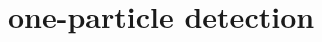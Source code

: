 \documentclass[prd,twocolumn,superscriptaddress,nofootinbib,floatfix,amsmath,amssymb]{revtex4-2}
\newcommand{\bx}{\bm{x}}
\newcommand{\sx}{\mathsf{x}}
\newcommand{\normal}[1]{:\mathrel{#1}:}
\DeclareMathOperator{\tr}{\text{tr}}
\newcommand{\rr}[1]{\left(#1\right)}
\newcommand{\eri}[1]{\textcolor{OliveGreen}{\textbf{[\textbf{\textcolor{black}{Erickson}}: #1]}}}
\newcommand{\vac}{\text{vac}}
\begin{document}
    
    	
    \section{one-particle detection}
    \label{sec: oneparticle}
    
    
\end{document}
